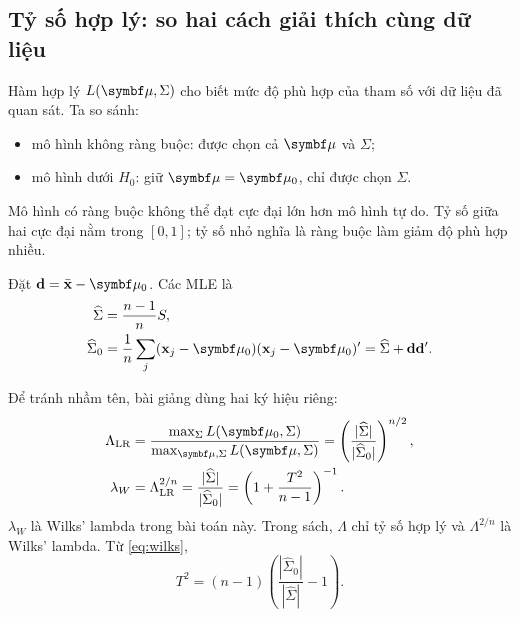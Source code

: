 \subsection{Tỷ số hợp lý: so hai cách giải thích cùng dữ liệu}
Hàm hợp lý $L(\vmu,\Sigma)$ cho biết mức độ phù hợp của tham số với
dữ liệu đã quan sát. Ta so sánh:
\begin{itemize}
 \item mô hình không ràng buộc: được chọn cả $\vmu$ và $\Sigma$;
 \item mô hình dưới $H_0$: giữ $\vmu=\vmu_0$, chỉ được chọn $\Sigma$.
\end{itemize}
Mô hình có ràng buộc không thể đạt cực đại lớn hơn mô hình tự do. Tỷ số
giữa hai cực đại nằm trong $[0,1]$; tỷ số nhỏ nghĩa là ràng buộc làm giảm
độ phù hợp nhiều.

Đặt $\mathbf d=\xbar-\vmu_0$. Các MLE là
\begin{align}
 \widehat\Sigma&=\frac{n-1}{n}S,\\
 \widehat\Sigma_0&=\frac1n\sum_j(\mathbf x_j-\vmu_0)(\mathbf x_j-\vmu_0)'
 =\widehat\Sigma+\mathbf d\mathbf d'.
\end{align}

Để tránh nhầm tên, bài giảng dùng hai ký hiệu riêng:
\begin{align}
 \Lambda_{\mathrm{LR}}
 &=\frac{\max_{\Sigma}L(\vmu_0,\Sigma)}{\max_{\vmu,\Sigma}L(\vmu,\Sigma)}
 =\left(\frac{|\widehat\Sigma|}{|\widehat\Sigma_0|}\right)^{n/2},\\
 \lambda_W&=\Lambda_{\mathrm{LR}}^{2/n}
 =\frac{|\widehat\Sigma|}{|\widehat\Sigma_0|}
 =\left(1+\frac{T^2}{n-1}\right)^{-1}.
 \label{eq:wilks}
\end{align}
$\lambda_W$ là Wilks' lambda trong bài toán này.
Trong sách, $\Lambda$ chỉ tỷ số hợp lý và $\Lambda^{2/n}$ là Wilks' lambda.
Từ \eqref{eq:wilks},
\begin{equation}
 T^2=(n-1)\left(\frac{|\widehat\Sigma_0|}{|\widehat\Sigma|}-1\right).
 \label{eq:t2det}
\end{equation}



